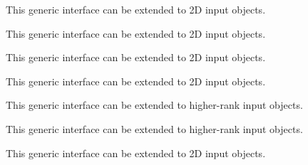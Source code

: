 \begin{DoxyRefList}
\label{todo__todo000012}%
%
 This generic interface can be extended to 2D input objects. ~\newline
 
\item[Type \mbox{\hyperlink{interfaceArrayResize__mod_1_1resize}{Array\+Resize\+\_\+mod\+::resize}} ]\label{todo__todo000015}%
%
 This generic interface can be extended to 2D input objects. ~\newline
 
\item[Type \mbox{\hyperlink{interfaceArrayReverse__mod_1_1genReverse}{Array\+Reverse\+\_\+mod\+::gen\+Reverse}} ]\label{todo__todo000016}%
%
 This generic interface can be extended to 2D input objects. ~\newline
 
\item[Type \mbox{\hyperlink{interfaceArrayReverse__mod_1_1reverse}{Array\+Reverse\+\_\+mod\+::reverse}} ]\label{todo__todo000017}%
%
 This generic interface can be extended to 2D input objects. ~\newline
 
\item[Type \mbox{\hyperlink{interfaceArraySelect__mod_1_1genSelected}{Array\+Select\+\_\+mod\+::gen\+Selected}} ]\label{todo__todo000018}%
%
 This generic interface can be extended to higher-\/rank input objects.~\newline
 
\item[Type \mbox{\hyperlink{interfaceArraySelect__mod_1_1select}{Array\+Select\+\_\+mod\+::select}} ]\label{todo__todo000019}%
%
 This generic interface can be extended to higher-\/rank input objects.~\newline
 
\item[Type \mbox{\hyperlink{interfaceArrayShuffle__mod_1_1shuffle}{Array\+Shuffle\+\_\+mod\+::shuffle}} ]\label{todo__todo000020}%
%
 This generic interface can be extended to 2D input objects. ~\newline
 

\end{DoxyRefList}
